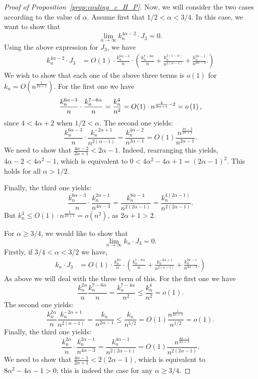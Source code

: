 \begin{proof}[Proof of Proposition~\ref{prop:couling_c_H_P}]
Now, we will consider the two cases according to the value of $\alpha$. 
Assume first that $1/2 < \alpha < 3/4$. 
In this case, we want to show that 
\begin{equation} \label{eq:int3_to_prove_I}
\lim_{n \to \infty} k_n^{4\alpha -2} \cdot J_3 = 0. 
\end{equation}
Using the above expression for $J_3$, we have 
\begin{align*} 
 k_n^{4\alpha -2} \cdot J_3 &= O(1) \cdot  
 \frac{k_n^{6\alpha -3}}{n} \cdot 
\left( 
\frac{k_n^{7-6\alpha}}{n} + \frac{k_n^{2(1-\alpha)}}{n^{2(\alpha-1)}} 
+\frac{k_n^{2\alpha-1}}{n^{4\alpha - 3}}.
\right) 
\end{align*}
We wish to show that each one of the above three terms is $o(1)$ for $k_n = O(n^{\frac{1}{2\alpha +1}})$. 
For the first one we have 
\[ 
\frac{k_n^{6\alpha -3}}{n} \cdot \frac{k_n^{7-6\alpha}}{n} = \frac{k_n^{4}}{n^2} = O(1) \cdot n^{\frac{4}{2\alpha +1} -2} = o\left(1\right), 
\]
since $4 < 4\alpha + 2$ when $1/2 < \alpha$.
The second one yields: 
\[
	\frac{k_n^{6\alpha -3}}{n} \cdot  \frac{k_n^{-2\alpha+1}}{n^{2(\alpha-1)}} =\frac{k_n^{4\alpha -2}}{n^{2\alpha -1}} =O(1) \frac{n^{\frac{4\alpha -2}{2\alpha+1}}}{n^{2\alpha -1}}.
\]
We need to show that $\frac{4\alpha -2}{2\alpha+1}< 2\alpha -1$. Indeed, rearranging this 
yields, $4\alpha -2 < 4\alpha^2 -1$, which is equivalent to $0< 4\alpha^2 - 4\alpha +1=(2\alpha- 1)^2$. This holds for all $\alpha >1/2$.  
 
Finally, the third one yields: 
\[
	\frac{k_n^{6\alpha -3}}{n} \cdot \frac{k_n^{2\alpha -1}}{n^{4\alpha - 3}}  
	= \frac{k_n^{8\alpha -4}}{n^{2(2\alpha -1)}} = \frac{k_n^{4(2\alpha -1)}}{n^{2(2\alpha-1)}}.
\]
But $k_n^4 \leq O(1)\cdot n^{\frac{4}{2\alpha+1}} = o(n^2)$, as $2\alpha +1 >2$.
 
For $\alpha \ge 3/4$, we would like to show that 
\begin{equation} \label{eq:int3_to_prove_II}
\lim_{n \to \infty} k_n \cdot J_3 = 0. 
\end{equation}
Firstly, if $3/4 < \alpha < 3/2$ we have, 
\begin{align*} 
 k_n \cdot J_3 &= O(1) \cdot  
 \frac{k_n^{2\alpha}}{n} \cdot 
\left( 
\frac{k_n^{7-6\alpha}}{n} + \frac{k_n^{-2\alpha +1}}{n^{2(\alpha-1)}} 
+\frac{k_n^{2\alpha -1}}{n^{4\alpha - 3}}.
\right) 
\end{align*}
As above we will deal with the three term of this. 
For the first one we have 
\[
	\frac{k_n^{2\alpha}}{n} \frac{k_n^{7-6\alpha}}{n}  = \frac{k_n^{7-4\alpha }}{n^2} \le   
	\frac{k_n^{4}}{n^2} =o(1). 
\]
The second one yields: 
\[
	\frac{k_n^{2\alpha}}{n} \frac{k_n^{-2\alpha +1}}{n^{2(\alpha-1)}} =
	\frac{k_n}{n^{2\alpha-1}} \le \frac{k_n}{n^{1/2}} = O(1) 
	\frac{n^{\frac{1}{2\alpha+1}}}{n^{1/2}} =o(1).
\]
Finally, the third one yields: 
\[
	\frac{k_n^{2\alpha}}{n} \cdot \frac{k_n^{2\alpha -1}}{n^{4\alpha - 3}}
	= \frac{k_n^{4\alpha -1}}{n^{2(2\alpha -1)}}=
O(1) \frac{n^{\frac{4\alpha-1}{2\alpha+1}}}{n^{2(2\alpha -1)}}.
\]
We need to show that $\frac{4\alpha-1}{2\alpha+1}< 2(2\alpha -1)$, which is 
equivalent to $8\alpha^2 - 4 \alpha -1>0$; this is indeed the case for any $\alpha \geq 3/4$. 


\end{proof}

